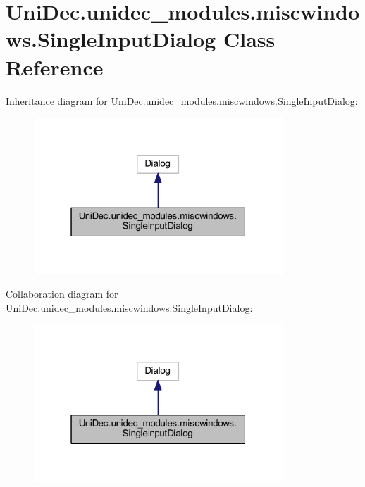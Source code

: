 \hypertarget{class_uni_dec_1_1unidec__modules_1_1miscwindows_1_1_single_input_dialog}{}\section{Uni\+Dec.\+unidec\+\_\+modules.\+miscwindows.\+Single\+Input\+Dialog Class Reference}
\label{class_uni_dec_1_1unidec__modules_1_1miscwindows_1_1_single_input_dialog}


Inheritance diagram for Uni\+Dec.\+unidec\+\_\+modules.\+miscwindows.\+Single\+Input\+Dialog\+:\nopagebreak
\begin{figure}[H]
\begin{center}
\leavevmode
\includegraphics[width=265pt]{class_uni_dec_1_1unidec__modules_1_1miscwindows_1_1_single_input_dialog__inherit__graph}
\end{center}
\end{figure}


Collaboration diagram for Uni\+Dec.\+unidec\+\_\+modules.\+miscwindows.\+Single\+Input\+Dialog\+:\nopagebreak
\begin{figure}[H]
\begin{center}
\leavevmode
\includegraphics[width=265pt]{class_uni_dec_1_1unidec__modules_1_1miscwindows_1_1_single_input_dialog__coll__graph}
\end{center}
\end{figure}
